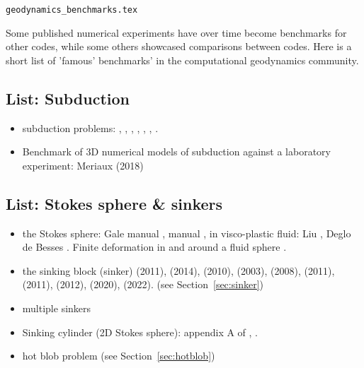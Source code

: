 
\begin{flushright} {\tiny {\color{gray} \tt geodynamics\_benchmarks.tex}} \end{flushright}

Some published numerical experiments have over time become benchmarks for other codes, while some 
others showcased comparisons between codes. Here is a short list of 'famous' benchmarks' in the 
computational geodynamics community.

\subsection{List: Subduction}

\begin{itemize}
\item subduction problems: \textcite{spka06}, \textcite{scbe08}, 
                           \textcite{vack08}, \textcite{cehg14},
                           \textcite{gltf18}, \textcite{ozrs08},
                           \textcite{siwi20}.

\item Benchmark of 3D numerical models of subduction against a laboratory experiment: 
      Meriaux \etal (2018)  \cite{memm18}



\end{itemize}

\subsection{List: Stokes sphere \& sinkers}

\begin{itemize}
\item the Stokes sphere: Gale manual \cite{galemanual}, 
      \aspect{} manual \cite{aspectmanual}, 
      in visco-plastic fluid: Liu \etal \cite{limd02}, 
      Deglo de Besses \etal \cite{demj04}. 
      Finite deformation in and around a fluid sphere \cite{sccm88,crud88}.

\item the sinking block (sinker) 
      \textcite{thie11} (2011),
      \textcite{cehg14} (2014),
      \textcite{gery10} (2010),
      \textcite{geyu03} (2003),
      \textcite{mamo08} (2008),
      \textcite{mishin11} (2011),
      \textcite{fumt11} (2011),
      \textcite{maie12} (2012),
      \textcite{sctc20} (2020),
      \textcite{mivg22} (2022). 
      (see Section~\ref{sec:sinker})

\item multiple sinkers \cite{mabl14,mabl15,clhe21,rusg17}

\item Sinking cylinder (2D Stokes sphere): 
      appendix A of \cite{boht08a}, \cite{wali04}.

\item hot blob problem \cite{bugs09,fumt11} (see Section~\ref{sec:hotblob})
\end{itemize}


